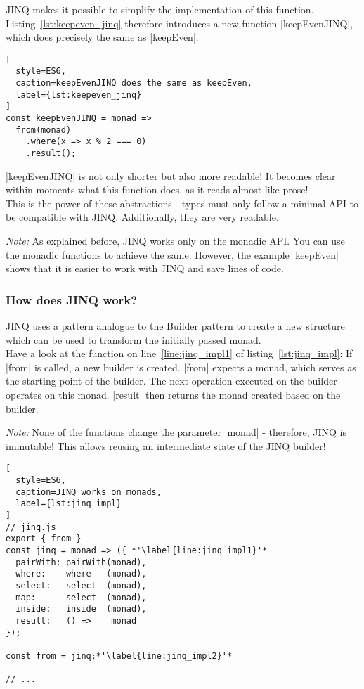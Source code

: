 JINQ makes it possible to simplify the implementation of this function.
Listing~\ref{lst:keepeven_jinq} therefore introduces a new function
|keepEvenJINQ|, which does precisely the same as |keepEven|:

\begin{lstlisting}[
  style=ES6,
  caption=keepEvenJINQ does the same as keepEven,
  label={lst:keepeven_jinq}
]
const keepEvenJINQ = monad =>
  from(monad)
    .where(x => x % 2 === 0)
    .result();
\end{lstlisting}

|keepEvenJINQ| is not only shorter but also more readable! It becomes clear
within moments what this function does, as it reads almost like prose!\\
This is the power of these abstractions - types must only follow a
minimal API to be compatible with JINQ. Additionally, they are very readable.

\textit{Note:} As explained before, JINQ works only on the monadic API.
You can use the monadic functions to achieve the same.
However, the example |keepEven| shows that it is easier to work with JINQ and 
save lines of code.

\subsubsection{How does JINQ work?} %
\label{subsub:How does JINQ work?}
JINQ uses a pattern analogue to the Builder pattern
\cite[Ch.~3.2]{gang_of_four_depa} to create a new structure which can be
used to transform the initially passed monad. \\
Have a look at the function on line~\ref{line:jinq_impl1} of
listing~\ref{lst:jinq_impl}: If |from| is called, a new builder is created.
|from| expects a monad, which serves as the starting point of the builder. The
next operation executed on the builder operates on this monad. |result| then
returns the monad created based on the builder.

\textit{Note:} None of the functions change the parameter |monad| - therefore,
JINQ is immutable! This allows reusing an intermediate state of the JINQ
builder!

\begin{lstlisting}[
  style=ES6,
  caption=JINQ works on monads,
  label={lst:jinq_impl}
]
// jinq.js
export { from }
const jinq = monad => ({ *'\label{line:jinq_impl1}'*
  pairWith: pairWith(monad),
  where:    where   (monad),
  select:   select  (monad),
  map:      select  (monad),
  inside:   inside  (monad),
  result:   () =>    monad
});

const from = jinq;*'\label{line:jinq_impl2}'*

// ...
\end{lstlisting}


